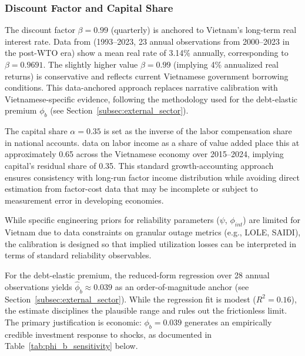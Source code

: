 \documentclass[12pt, a4paper]{article}
\begin{document}
	\subsubsection*{Discount Factor and Capital Share}

	The discount factor $\beta = 0.99$ (quarterly) is anchored to Vietnam's long-term real interest rate. Data from \citep{worldbank2024} (1993--2023, 23 annual observations from 2000--2023 in the post-WTO era) show a mean real rate of 3.14\% annually, corresponding to $\beta = 0.9691$. The slightly higher value $\beta = 0.99$ (implying 4\% annualized real returns) is conservative and reflects current Vietnamese government borrowing conditions. This data-anchored approach replaces narrative calibration with Vietnamese-specific evidence, following the methodology used for the debt-elastic premium $\phi_b$ (see Section~\ref{subsec:external_sector}).

	The capital share $\alpha = 0.35$ is set as the inverse of the labor compensation share in national accounts. \citet{gso2024} data on labor income as a share of value added place this at approximately 0.65 across the Vietnamese economy over 2015--2024, implying capital's residual share of 0.35. This standard growth-accounting approach ensures consistency with long-run factor income distribution while avoiding direct estimation from factor-cost data that may be incomplete or subject to measurement error in developing economies.

	While specific engineering priors for reliability parameters ($\psi$, $\phi_{int}$) are limited for Vietnam due to data constraints on granular outage metrics (e.g., LOLE, SAIDI), the calibration is designed so that implied utilization losses can be interpreted in terms of standard reliability observables.
	
	For the debt-elastic premium, the reduced-form regression over 28 annual observations yields $\hat{\phi}_b \approx 0.039$ as an order-of-magnitude anchor (see Section~\ref{subsec:external_sector}). While the regression fit is modest ($R^2 = 0.16$), the estimate disciplines the plausible range and rules out the frictionless limit. The primary justification is economic: $\phi_b = 0.039$ generates an empirically credible investment response to shocks, as documented in Table~\ref{tab:phi_b_sensitivity} below.
	
\end{document}
